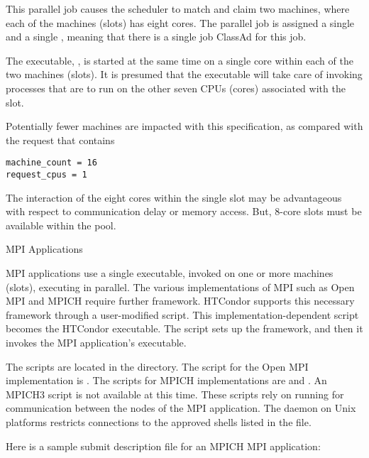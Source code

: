 This parallel job causes the scheduler to match and claim two
machines, where each of the machines (slots) has eight cores.
The parallel job is assigned a single 
and a single , meaning that there is a single job
ClassAd for this job.

The executable, , is started at the same time
on a single core within each of the two machines (slots).
It is presumed that the executable will take care of invoking
processes that are to run on the other seven CPUs (cores)
associated with the slot. 

Potentially fewer machines are impacted with this specification,
as compared with the request that contains
\footnotesize
\begin{verbatim}
machine_count = 16
request_cpus = 1
\end{verbatim}
\normalsize
The interaction of the eight cores within the single slot may 
be advantageous with respect to communication delay or memory access.
But, 8-core slots must be available within the pool.

\label{sec:parallel-mpi-submit}
\begin{description}
\item[MPI Applications]
\end{description}


MPI applications use a single executable, 
invoked on one or more machines (slots), executing in parallel. 
The various implementations of MPI
such as Open MPI and MPICH require further framework.
HTCondor supports this necessary framework through 
a user-modified script.
This implementation-dependent script becomes the HTCondor executable.
The script sets up the framework,
and then it invokes the MPI application's executable.

The scripts are located in the
 directory.
The script for the Open MPI implementation is .
The scripts for MPICH implementations are  and .
An MPICH3 script is not available at this time.
These scripts rely on running  
for communication between the nodes of the MPI application.
The  daemon on Unix platforms restricts
connections to the approved shells listed in the  file.

Here is a sample submit description file for an MPICH MPI application:

